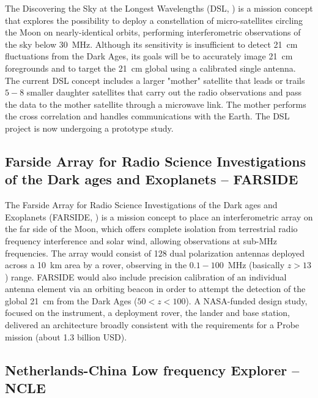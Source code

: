 The Discovering the Sky at the Longest Wavelengths (DSL, \cite{chen19}) is a mission concept that explores the possibility to deploy a constellation of micro-satellites circling the Moon on nearly-identical orbits, performing interferometric observations of the sky below 30~MHz. 
Although its sensitivity is insufficient to detect 21~cm fluctuations from the Dark Ages, its goals will be to accurately image 21~cm foregrounds and to target the 21~cm global using a calibrated single antenna. 
The current DSL concept includes a larger "mother" satellite that leads or trails $5-8$ smaller daughter satellites that carry out the radio observations and pass the data to the mother satellite through a microwave link. The mother performs the cross correlation and handles communications with the Earth. 
The DSL project is now undergoing a prototype study.




\subsection{Farside Array for Radio Science Investigations of the Dark ages and Exoplanets -- FARSIDE}

The Farside Array for Radio Science Investigations of the Dark ages and Exoplanets (FARSIDE, \cite{burns19b}) is a mission concept to place an interferometric array on the far side of the Moon, which offers complete isolation from terrestrial radio frequency interference and solar wind, allowing observations at sub-MHz frequencies. The array would consist of 128 dual polarization antennas deployed across a 10~km area by a rover, observing in the $0.1-100$~MHz (basically $z > 13$) range. FARSIDE would also include precision calibration of an individual antenna element via an orbiting beacon in order to attempt the detection of the global 21~cm from the Dark Ages ($50 < z < 100$).
%
A NASA-funded design study, focused on the instrument, a deployment rover, the lander and base station, delivered an architecture broadly consistent with the requirements for a Probe mission (about 1.3 billion USD).


\subsection{Netherlands-China Low frequency Explorer -- NCLE}

